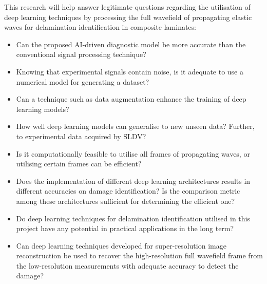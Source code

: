 This research will help answer legitimate questions regarding the utilisation of deep learning techniques by processing the full wavefield of propagating elastic waves for delamination identification in composite laminates:
\begin{itemize}
	\item Can the proposed AI-driven diagnostic model be more accurate than the conventional signal processing technique?
	\item Knowing that experimental signals contain noise, is it adequate to use a numerical model for generating a dataset?
	\item Can a technique such as data augmentation enhance the training of deep learning models?
	\item How well deep learning models can generalise to new unseen data? Further, to experimental data acquired by SLDV?
	\item Is it computationally feasible to utilise all frames of propagating waves, or utilising certain frames can be efficient?
	\item Does the implementation of different deep learning architectures results in different accuracies on damage identification? Is the comparison metric among these architectures sufficient for determining the efficient one?
	\item Do deep learning techniques for delamination identification utilised in this project have any potential in practical applications in the long term?
	\item Can deep learning techniques developed for super-resolution image reconstruction be used to recover the high-resolution full wavefield frame from the low-resolution measurements with adequate accuracy to detect the damage?
\end{itemize}
